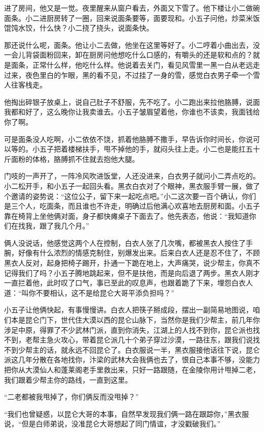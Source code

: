 进了房间，他又是一觉。夜里醒来从窗户看去，外面又下雪了。他下楼让小二做碗面条。小二进厨房转了一圈，回来说面条要等，面要现和。小五子问他，炒菜米饭馄饨水饺，什么快？小二挠了挠头，说面条快。

那还说什么呢，面条。他让小二去做，他坐在这里等好了。小二哼着小曲出去，没一会儿背袋面粉回来，卸在厨房问他想吃什么口感的，有嚼头的还是软和点的？就是面条，正常什么样，他吃什么样。他说着去关门，看见风雪里一黑一白从老远走过来，夜色里白的乍眼，黑的看不见，不过挂了一身的雪，感觉白衣男子牵一个雪人往客栈走。

他掏出碎银子放桌上，说自己肚子不舒服，先不吃了。小二跑出来拉他胳膊，说面我都和好了，这么晚你让我卖谁去。小五子皱眉望着他，你谁也不该卖，我面钱给你了啊。

可是面条没人吃啊，小二依依不饶，抓着他胳膊不撒手，早告诉你时间长，你说可以等的。小五子把着楼梯扶手，甩不掉他的手，就闷头往上走。小二也是能扛五十斤面粉的体格，胳膊抓不住就去抱他大腿。

门吱的一声开了，一阵冷风吹进饭堂，人还没进来，白衣男子就问小二弄点吃的。小二松开手，和小五子一起回头看。黑衣白衣对了个眼神，黑衣服手臂一展，做了个邀请的姿势说：“这位公子，留下来一起吃点吧。”小二这次要一百个确认，你们是三个人，吃面条，而且谁也不许走，明确过后他满心欢喜地去厨房和面。小五子靠在椅背上坐他俩对面，身子都快瘫桌子下面去了。他先表态，他说：“我知道你们在找我，跟了我几个月。”

俩人没说话，他感觉这两个人在控制，白衣人张了几次嘴，都被黑衣人按住了手腕，好像有什么浓烈的情感克制住，别爆发出来。后来白衣人还是忍不住了，不顾黑衣人反对，起身把椅子踢开，扑通一下跪在地上，大声痛哭，说少帮主，你真不记得我们了吗？小五子腾地跳起来，但不是扶他，而是向后退了两步。黑衣人刚才
一直拦着他，此时叹了口气，事已至此的叹息声，也跟着跪了下来，埋怨白衣人道：“叫你不要相认，这不是给昆仑大哥平添负担吗？”

小五子让他俩快起，有事慢慢讲。白衣人把筷子掰成段，摆出一副简易地图说，咱们本是昆仑门下，世代住大漠以西的昆仑山脉下，当然你是我们少帮主，前几年你涉足中原，得罪了不少武林门派，直到你消失，江湖上的人找不到你，昆仑派也找不到，老帮主急火攻心，带着昆仑派几十个弟子穿过沙漠，一路往东，跟我们说找不到少帮主的话，就永远不回昆仑了。白衣服说一半，黑衣服接他话往下说，昆仑派这几年分散在各地找你，汴梁的武林大会我俩也去了，恨自己本事不够，没能力把你从大漠仙人和蓬莱阁老手里救出来，只好一路跟随，在金陵你用计甩掉二老，我们跟着少帮主你的路线，一直到这里。

“二老都被我甩掉了，你们俩反而没甩掉？”

“我们也曾疑惑，以昆仑大哥的本事，自然早发现我们俩一路在跟踪你，”黑衣服说，“但是白师弟说，没准昆仑大哥想起了同门情谊，才没戳破我们。”

